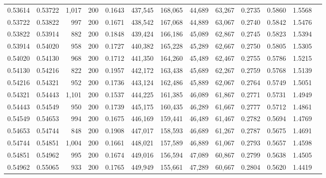\begin{tabular}{rrrrrrrrrrrrr}
0.53614 & 0.53722 & 1,017 & 200 &                                     0.1643 & 437,545 & 168,065 &  44,689 &  63,267 & 0.2735 & 0.5860 & 1.5568 \\
0.53722 & 0.53822 &   997 & 200 &                                     0.1671 & 438,542 & 167,068 &  44,889 &  63,067 & 0.2740 & 0.5842 & 1.5476 \\
0.53822 & 0.53914 &   882 & 200 &                                     0.1848 & 439,424 & 166,186 &  45,089 &  62,867 & 0.2745 & 0.5823 & 1.5394 \\
0.53914 & 0.54020 &   958 & 200 &                                     0.1727 & 440,382 & 165,228 &  45,289 &  62,667 & 0.2750 & 0.5805 & 1.5305 \\
0.54020 & 0.54130 &   968 & 200 &                                     0.1712 & 441,350 & 164,260 &  45,489 &  62,467 & 0.2755 & 0.5786 & 1.5215 \\
0.54130 & 0.54216 &   822 & 200 &                                     0.1957 & 442,172 & 163,438 &  45,689 &  62,267 & 0.2759 & 0.5768 & 1.5139 \\
0.54216 & 0.54321 &   952 & 200 &                                     0.1736 & 443,124 & 162,486 &  45,889 &  62,067 & 0.2764 & 0.5749 & 1.5051 \\
0.54321 & 0.54443 & 1,101 & 200 &                                     0.1537 & 444,225 & 161,385 &  46,089 &  61,867 & 0.2771 & 0.5731 & 1.4949 \\
0.54443 & 0.54549 &   950 & 200 &                                     0.1739 & 445,175 & 160,435 &  46,289 &  61,667 & 0.2777 & 0.5712 & 1.4861 \\
0.54549 & 0.54653 &   994 & 200 &                                     0.1675 & 446,169 & 159,441 &  46,489 &  61,467 & 0.2782 & 0.5694 & 1.4769 \\
0.54653 & 0.54744 &   848 & 200 &                                     0.1908 & 447,017 & 158,593 &  46,689 &  61,267 & 0.2787 & 0.5675 & 1.4691 \\
0.54744 & 0.54851 & 1,004 & 200 &                                     0.1661 & 448,021 & 157,589 &  46,889 &  61,067 & 0.2793 & 0.5657 & 1.4598 \\
0.54851 & 0.54962 &   995 & 200 &                                     0.1674 & 449,016 & 156,594 &  47,089 &  60,867 & 0.2799 & 0.5638 & 1.4505 \\
0.54962 & 0.55065 &   933 & 200 &                                     0.1765 & 449,949 & 155,661 &  47,289 &  60,667 & 0.2804 & 0.5620 & 1.4419 \\

\end{tabular}
